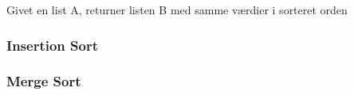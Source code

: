 Givet en list A, returner listen B med samme værdier i sorteret orden
\subsubsection{Insertion Sort}


\subsubsection{Merge Sort}
